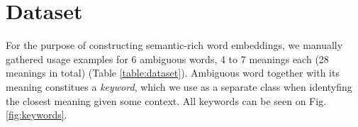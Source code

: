 \documentclass{llncs}
\begin{document}



\section{Dataset}
\label{sec:dataset}

For the purpose of constructing semantic-rich word embeddings, we manually gathered usage examples for 6 ambiguous words, 4 to 7 meanings each (28 meanings in total) (Table \ref{table:dataset}).
Ambiguous word together with its meaning constitues a \textit{keyword}, which we use as a separate class when identyfing the closest meaning given some context.
All keywords can be seen on Fig. \ref{fig:keywords}.
\end{document}
